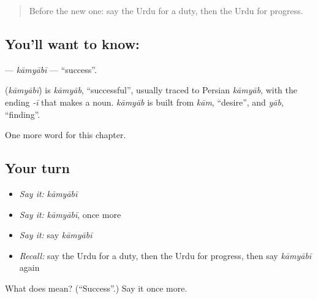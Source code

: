 \begin{quote}
Before the new one: say the Urdu for a duty, then the Urdu for progress.
\end{quote}

\subsection*{You'll want to know: }
\textbf{} — \emph{kāmyābī} — \textquotedblleft{}success\textquotedblright{}.

\begin{cousinweb}
\textbf{} (\emph{kāmyābī}) is \emph{kāmyāb}, \textquotedblleft{}successful\textquotedblright{}, usually traced to Persian \emph{kāmyāb}, with the ending \emph{-ī} that makes a noun. \emph{kāmyāb} is built from \emph{kām}, \textquotedblleft{}desire\textquotedblright{}, and \emph{yāb}, \textquotedblleft{}finding\textquotedblright{}.
\end{cousinweb}

\begin{grammarlens}[title={What you've built}]
One more word for this chapter.
\end{grammarlens}

\subsection*{Your turn}
\begin{itemize}
\raggedright
  \item \emph{Say it:} \emph{kāmyābī}
  \item \emph{Say it:} \emph{kāmyābī}, once more
  \item \emph{Say it:} say \emph{kāmyābī}
  \item \emph{Recall:} say the Urdu for a duty, then the Urdu for progress, then say \emph{kāmyābī} again
\end{itemize}

\begin{tcolorbox}[breakable,colback=teal!4,colframe=teal!35!black,title={Before you move on}]
What does  mean? (\textquotedblleft{}Success\textquotedblright{}.) Say it once more.
\end{tcolorbox}
